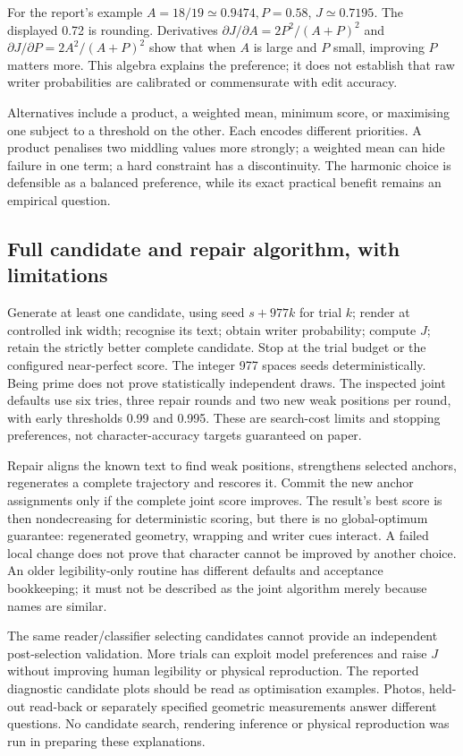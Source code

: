 For the report's example $A=18/19\simeq0.9474,P=0.58$, $J\simeq0.7195$.
The displayed 0.72 is rounding. Derivatives
$\partial J/\partial A=2P^2/(A+P)^2$ and
$\partial J/\partial P=2A^2/(A+P)^2$ show that when $A$ is large and
$P$ small, improving $P$ matters more. This algebra explains the preference;
it does not establish that raw writer probabilities are calibrated or
commensurate with edit accuracy.

Alternatives include a product, a weighted mean, minimum score, or maximising
one subject to a threshold on the other. Each encodes different priorities.
A product penalises two middling values more strongly; a weighted mean can
hide failure in one term; a hard constraint has a discontinuity. The harmonic
choice is defensible as a balanced preference, while its exact practical
benefit remains an empirical question.

\subsection{Full candidate and repair algorithm, with limitations}
Generate at least one candidate, using seed $s+977k$ for trial $k$;
render at controlled ink width; recognise its text; obtain writer probability;
compute $J$; retain the strictly better complete candidate. Stop at the trial
budget or the configured near-perfect score. The integer 977 spaces seeds
deterministically. Being prime does not prove statistically independent draws.
The inspected joint defaults use six tries, three repair rounds and two new
weak positions per round, with early thresholds 0.99 and 0.995. These are
search-cost limits and stopping preferences, not character-accuracy targets
guaranteed on paper.

Repair aligns the known text to find weak positions, strengthens selected
anchors, regenerates a complete trajectory and rescores it. Commit the
new anchor assignments only if the complete joint score improves. The
result's best score is then nondecreasing for deterministic scoring, but
there is no global-optimum guarantee: regenerated geometry, wrapping and
writer cues interact. A failed local change does not prove that character
cannot be improved by another choice. An older legibility-only routine has
different defaults and acceptance bookkeeping; it must not be described as
the joint algorithm merely because names are similar.

The same reader/classifier selecting candidates cannot provide an independent
post-selection validation. More trials can exploit model preferences and
raise $J$ without improving human legibility or physical reproduction.
The reported diagnostic candidate plots should be read as optimisation
examples. Photos, held-out read-back or separately specified geometric
measurements answer different questions. No candidate search, rendering
inference or physical reproduction was run in preparing these explanations.
